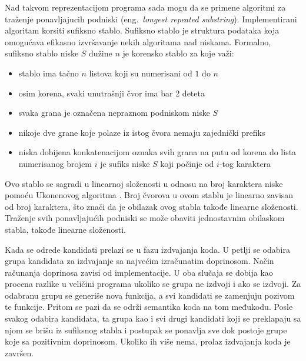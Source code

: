 \documentclass[12pt,oneside]{memoir}
\begin{document}
Nad takvom reprezentacijom programa sada mogu da se primene algoritmi za traženje ponavljajucih podniski (eng.~{\em longest repeated substring}).
Implementirani algoritam korsiti sufiksno stablo.
Sufiksno stablo je struktura podataka koja omogućava efikasno izvršavanje nekih algoritama nad niskama.
Formalno, sufiksno stablo niske $S$ dužine $n$ je korensko stablo za koje važi:
\begin{itemize}
  \item stablo ima tačno $n$ listova koji su numerisani od $1$ do $n$
  \item osim korena, svaki unutrašnji čvor ima bar 2 deteta
  \item svaka grana je označena nepraznom podniskom niske $S$
  \item nikoje dve grane koje polaze iz istog čvora nemaju zajednički prefiks
  \item niska dobijena konkatenacijom oznaka svih grana na putu od korena do lista numerisanog brojem $i$ je sufiks niske $S$ koji počinje od $i$-tog karaktera
\end{itemize}
Ovo stablo se sagradi u linearnoj složenosti u odnosu na broj karaktera niske pomoću Ukonenovog algoritma \cite{ukkonen1993suffix}.
Broj čvorova u ovom stablu je linearno zavisan od broj karaktera, što znači da je obilazak ovog stabla takođe linearne složenosti.
Traženje svih ponavljajućih podniski se može obaviti jednostavnim obilaskom stabla, takođe linearne složenosti.


Kada se odrede kandidati prelazi se u fazu izdvajanja koda.
U petlji se odabira grupa kandidata za izdvajanje sa najvećim izračunatim doprinosom.
Način računanja doprinosa zavisi od implementacije.
U oba slučaja se dobija kao procena razlike u veličini programa ukoliko se grupa ne izdvoji i ako se izdvoji.
Za odabranu grupu se generiše nova funkcija, a svi kandidati se zamenjuju pozivom te funkcije.
Pritom se pazi da se održi semantika koda na tom međukodu.
Posle svakog odabira kandidata, ta grupa kao i svi drugi kandidati koji se preklapaju sa njom se brišu iz sufiksnog stabla i postupak se ponavlja sve dok postoje grupe koje sa pozitivnim doprinosom.
Ukoliko ih više nema, prolaz izdvajanja koda je završen.
\end{document}
